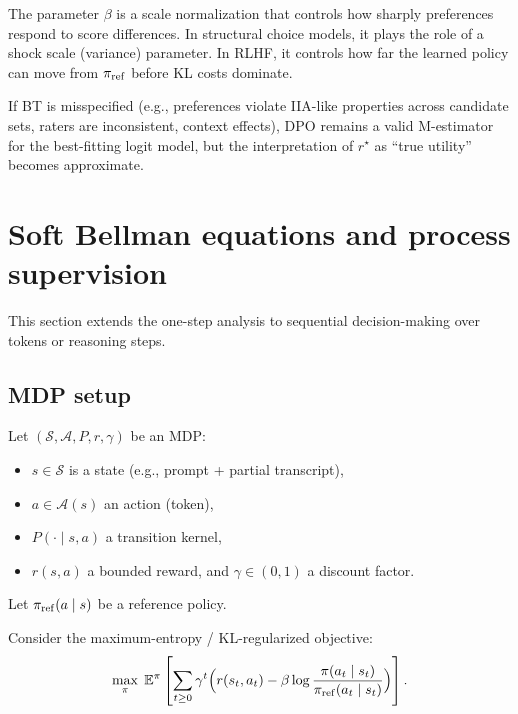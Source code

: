 \begin{remark}
The parameter $\beta$ is a scale normalization that controls how sharply preferences respond to score differences.
In structural choice models, it plays the role of a shock scale (variance) parameter.
In RLHF, it controls how far the learned policy can move from $\pi_{\mathrm{ref}}$ before KL costs dominate.
\end{remark}

\begin{remark}[Misspecification]
If BT is misspecified (e.g., preferences violate IIA-like properties across candidate sets, raters are inconsistent, context effects),
DPO remains a valid M-estimator for the best-fitting logit model, but the interpretation of $r^\star$ as ``true utility'' becomes approximate.
\end{remark}

\section{Soft Bellman equations and process supervision}\label{app:softbellman}

This section extends the one-step analysis to sequential decision-making over tokens or reasoning steps.

\subsection{MDP setup}
Let $(\mathcal{S},\mathcal{A},P,r,\gamma)$ be an MDP:
\begin{itemize}
    \item $s\in\mathcal{S}$ is a state (e.g., prompt + partial transcript),
    \item $a\in\mathcal{A}(s)$ an action (token),
    \item $P(\cdot\mid s,a)$ a transition kernel,
    \item $r(s,a)$ a bounded reward, and $\gamma\in(0,1)$ a discount factor.
\end{itemize}
Let $\pi_{\mathrm{ref}}(a\mid s)$ be a reference policy.

Consider the maximum-entropy / KL-regularized objective:
\begin{equation}\label{eq:entrl}
\max_{\pi}\;
\mathbb{E}^\pi\left[\sum_{t\ge 0}\gamma^t \Big(r(s_t,a_t) - \beta\log\frac{\pi(a_t\mid s_t)}{\pi_{\mathrm{ref}}(a_t\mid s_t)}\Big)\right].
\end{equation}

